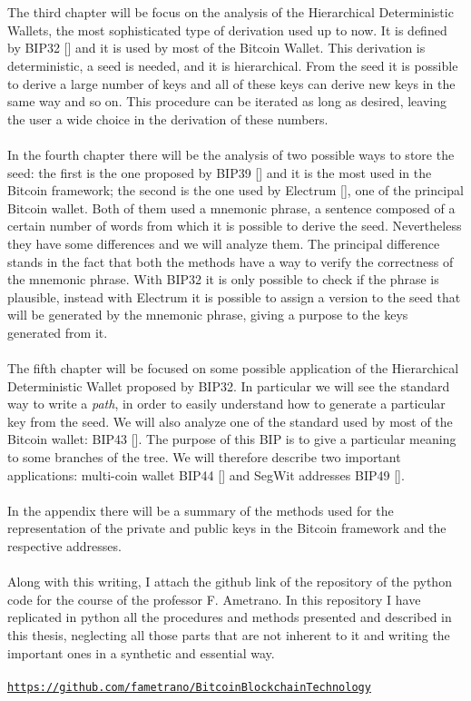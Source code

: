 \\ \\
The third chapter will be focus on the analysis of the Hierarchical Deterministic Wallets, the most sophisticated type of derivation used up to now. It is defined by BIP32 [\cite{1}] and it is used by most of the Bitcoin Wallet. This derivation is deterministic, a seed is needed, and it is hierarchical. From the seed it is possible to derive a large number of keys and all of these keys can derive new keys in the same way and so on. This procedure can be iterated as long as desired, leaving the user a wide choice in the derivation of these numbers.
\\ \\
In the fourth chapter there will be the analysis of two possible ways to store the seed: the first is the one proposed by BIP39 [\cite{2}] and it is the most used in the Bitcoin framework; the second is the one used by Electrum [\cite{3}], one of the principal Bitcoin wallet. Both of them used a mnemonic phrase, a sentence composed of a certain number of words from which it is possible to derive the seed. Nevertheless they have some differences and we will analyze them. The principal difference stands in the fact that both the methods have a way to verify the correctness of the mnemonic phrase. With BIP32 it is only possible to check if the phrase is plausible, instead with Electrum it is possible to assign a version to the seed that will be generated by the mnemonic phrase, giving a purpose to the keys generated from it.
\\ \\
The fifth chapter will be focused on some possible application of the Hierarchical Deterministic Wallet proposed by BIP32. In particular we will see the standard way to write a \textit{path}, in order to easily understand how to generate a particular key from the seed.  We will also analyze one of the standard used by most of the Bitcoin wallet: BIP43 [\cite{4}]. The purpose of this BIP is to give a particular meaning to some branches of the tree. We will therefore describe two important applications: multi-coin wallet BIP44 [\cite{5}] and SegWit addresses BIP49 [\cite{6}].
\\ \\
In the appendix there will be a summary of the methods used for the representation of the private and public keys in the Bitcoin framework and the respective addresses.
\\ \\
Along with this writing, I attach the github link of the repository of the python code for the course of the professor F. Ametrano. In this repository I have replicated in python all the procedures and methods presented and described in this thesis, neglecting all those parts that are not inherent to it and writing the important ones in a synthetic and essential way.
\\ \\
\hypersetup{
	colorlinks=true,
	urlcolor=black
}
\href{https://github.com/fametrano/BitcoinBlockchainTechnology}{\texttt{https://github.com/fametrano/BitcoinBlockchainTechnology}}
